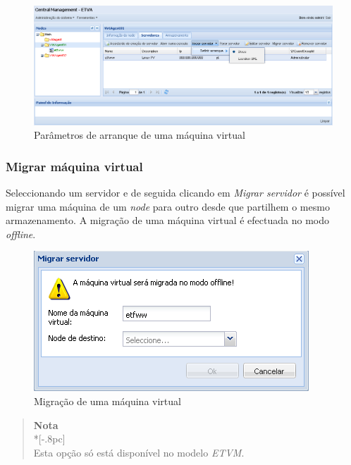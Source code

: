 \begin{figure}[H]
	\begin{center}
	\includegraphics[scale=0.45]{screenshots/server_start.png}
	\caption{Parâmetros de arranque de uma máquina virtual}
	\label{fig:server_start}
	\end{center}
\end{figure}


\subsubsection{Migrar máquina virtual}
\label{sec:migrate_server}

Seleccionando um servidor e de seguida clicando em \emph{Migrar servidor} é possível migrar uma máquina de um \emph{node} para outro desde que partilhem o mesmo armazenamento.
A migração de uma máquina virtual é efectuada no modo \emph{offline}.

\begin{figure}[H]
	\begin{center}
	\includegraphics[scale=0.5]{screenshots/server_migrate.png}
	\caption{Migração de uma máquina virtual}
	\label{fig:server_migrate}
	\end{center}
\end{figure}

\begin{quote}
	{\large \bf Nota} \\*[-.8pc]
	\underline{\hspace{6in}} \\
	Esta opção só está disponível no modelo \emph{ETVM}.
\end{quote}


